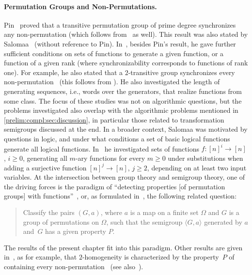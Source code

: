 \paragraph{Permutation Groups and Non-Permutations.} Pin~\cite{DBLP:conf/icalp/Pin78} 
proved that a transitive permutation group of prime degree
synchronizes any non-permutation (which follows
from~\cite[Lem.~3.1 \& Cor.~3.3]{ArnoldS06} as well).
This result was also stated by Salomaa~\cite[Thm.~5]{DBLP:journals/jucs/Salomaa02} (without reference to Pin).
In~\cite{DBLP:journals/eatcs/Salomaa00,DBLP:journals/jucs/Salomaa02,DBLP:journals/tcs/Salomaa03,DBLP:conf/birthday/Salomaa12},
besides Pin's result, 
he gave further sufficient conditions on sets of functions to generate
a given function, or a function of a given rank (where synchronizability corresponds to functions of rank one).
For example, he also stated 
that a $2$-transitive group synchronizes every non-permutation~\cite[Thm.~4]{DBLP:journals/jucs/Salomaa02} (this follows from ).
He also investigated  the length of generating sequences, i.e., words over the generators, that realize functions
from some class.
The focus of these studies was not on algorithmic questions, but 
the problems investigated also overlap with the algorithmic problems
mentioned in \cref{prelim:compl:sec:discussion}, in particular
those related to transformation semigroups discussed at the end.
In a broader context, Salomaa was motivated by questions in logic, and under what conditions a set of basic logical functions
generate all logical functions.
In~\cite{Salomaa60,Salomaa1964OnBG} 
he investigated sets of functions  $f \colon [n]^i \to [n]$, $i \ge 0$, generating all $m$-ary functions
for every $m \ge 0$ under substitutions when adding a surjective function $[n]^j \to [n]$, $j \ge 2$,
depending on at least two input variables.
At the intersection between group theory and semigroup theory, one of the driving forces is the paradigm
of ``detecting properties [of permutation groups] with functions''~\cite{ArCamSt2017}, or, 
as formulated in~\cite{ARAUJO2021a,araujo2016}, the following related question:
\begin{quote}
	Classify the pairs $(G, a)$, where $a$ is a map on a finite set $\Omega$ and $G$
	is a group of permutations on $\Omega$, such that the semigroup
	$\langle G, a \rangle$ generated by $a$ and~$G$ has a given property $P$.
\end{quote}
The results of the present chapter fit into this paradigm.
Other results are given in~\cite[Sec.~8]{ArCamSt2017}, as
for example, that $2$-homogeneity is characterized by the property~$P$
of containing every non-permutation~\cite[Thm.~3.18]{mcalister1998semigroups} (see also~\cite[Thm.~8.2]{ArCamSt2017}).

